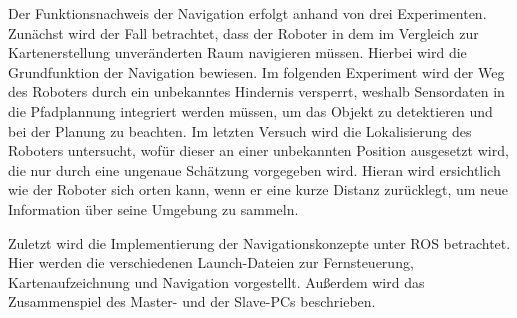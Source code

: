 Der Funktionsnachweis der Navigation erfolgt anhand von drei Experimenten. Zunächst wird der Fall betrachtet, dass der Roboter in dem im Vergleich zur Kartenerstellung unveränderten Raum navigieren müssen. Hierbei wird die Grundfunktion der Navigation bewiesen. Im folgenden Experiment wird der Weg des Roboters durch ein unbekanntes Hindernis versperrt, weshalb Sensordaten in die Pfadplannung integriert werden müssen, um das Objekt zu detektieren und bei der Planung zu beachten. Im letzten Versuch wird die Lokalisierung des Roboters untersucht, wofür dieser an einer unbekannten Position ausgesetzt wird, die nur durch eine ungenaue Schätzung vorgegeben wird. Hieran wird ersichtlich wie der Roboter sich orten kann, wenn er eine kurze Distanz zurücklegt, um neue Information über seine Umgebung zu sammeln.

Zuletzt wird die Implementierung der Navigationskonzepte unter ROS betrachtet. Hier werden die verschiedenen Launch-Dateien zur Fernsteuerung, Kartenaufzeichnung und Navigation vorgestellt. Außerdem wird das Zusammenspiel des Master- und der Slave-PCs beschrieben.
